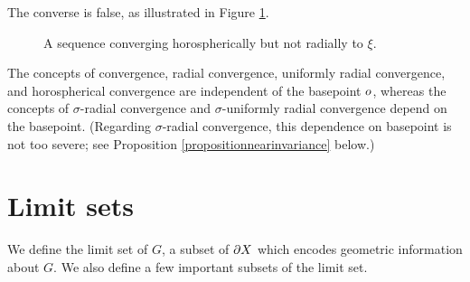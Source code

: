 The converse is false, as illustrated in Figure \ref{figurehorospherical}.


\begin{figure}
\begin{center}
\caption[Converging horospherically but not radially to the boundary]{A sequence converging horospherically but not radially to $\xi$.}
\label{figurehorospherical}
\end{center}
\end{figure}


\begin{observation}
\label{observationdependenceonbasepoint}
The concepts of convergence, radial convergence, uniformly radial convergence, and horospherical convergence are independent of the basepoint $o$, whereas the concepts of $\sigma$-radial convergence and $\sigma$-uniformly radial convergence depend on the basepoint. (Regarding $\sigma$-radial convergence, this dependence on basepoint is not too severe; see Proposition \ref{propositionnearinvariance} below.)
\end{observation}

\bigskip
\section{Limit sets}

We define the limit set of $G$, a subset of $\partial X$ which encodes geometric information about $G$. We also define a few important subsets of the limit set.

